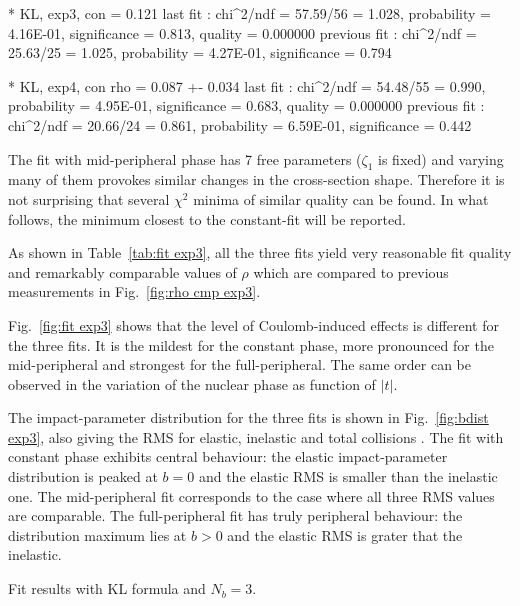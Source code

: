 * KL, exp3, con
\rh       =   0.121 
last fit     : chi^2/ndf = 57.59/56 = 1.028, probability = 4.16E-01, significance = 0.813, quality = 0.000000
previous fit : chi^2/ndf = 25.63/25 = 1.025, probability = 4.27E-01, significance = 0.794

* KL, exp4, con
rho    =   0.087 +-  0.034
last fit     : chi^2/ndf = 54.48/55 = 0.990, probability = 4.95E-01, significance = 0.683, quality = 0.000000
previous fit : chi^2/ndf = 20.66/24 = 0.861, probability = 6.59E-01, significance = 0.442
\fi


The fit with mid-peripheral phase has 7 free parameters ($\zeta_1$ is fixed) and varying many of them provokes similar changes in the cross-section shape. Therefore it is not surprising that several $\chi^2$ minima of similar quality can be found. In what follows, the minimum closest to the constant-fit will be reported.

As shown in Table~\ref{tab:fit exp3}, all the three fits yield very reasonable fit quality and remarkably comparable values of $\rho$ which are compared to previous measurements in Fig.~\ref{fig:rho cmp exp3}.

Fig.~\ref{fig:fit exp3} shows that the level of Coulomb-induced effects is different for the three fits. It is the mildest for the constant phase, more pronounced for the mid-peripheral and strongest for the full-peripheral. The same order can be observed in the variation of the nuclear phase as function of $|t|$.

The impact-parameter distribution  for the three fits is shown in Fig.~\ref{fig:bdist exp3}, also giving the RMS for elastic, inelastic and total collisions . The fit with constant phase exhibits central behaviour: the elastic impact-parameter distribution is peaked at $b=0$ and the elastic RMS is smaller than the inelastic one. The mid-peripheral fit corresponds to the case where all three RMS values are comparable. The full-peripheral fit has truly peripheral behaviour: the distribution maximum lies at $b > 0$ and the elastic RMS is grater that the inelastic.


\begin{table}
\caption{Fit results with KL formula and $N_b=3$. }
\vskip-3mm
\label{tab:fit exp3}
\begin{center}
\setlength\tabcolsep{5mm}
\small

\end{center}
\end{table}

